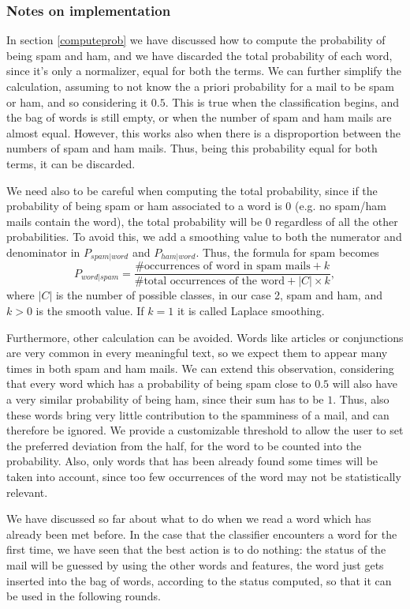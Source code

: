 \subsubsection{Notes on implementation}
In section \ref{computeprob} we have discussed how to compute the probability of being spam and ham, and we have discarded the total probability of each word, since it's only a normalizer, equal for both the terms. We can further simplify the calculation, assuming to not know the a priori probability for a mail to be spam or ham, and so considering it $0.5$. This is true when the classification begins, and the bag of words is still empty, or when the number of spam and ham mails are almost equal. However, this works also when there is a disproportion between the numbers of spam and ham mails. Thus, being this probability equal for both terms, it can be discarded.

We need also to be careful when computing the total probability, since if the probability of being spam or ham associated to a word is $0$ (e.g. no spam/ham mails contain the word), the total probability will be $0$ regardless of all the other probabilities. To avoid this, we add a smoothing value to both the numerator and denominator in $P_{spam|word}$ and $P_{ham|word}$. Thus, the formula for spam becomes $$P_{word|spam} = \frac{\mbox{\# occurrences of word in spam mails} + k}{\mbox{\# total occurrences of the word} + |C|\times k},$$ where $|C|$ is the number of possible classes, in our case 2, spam and ham, and $k > 0$ is the smooth value. If $k=1$ it is called Laplace smoothing.

Furthermore, other calculation can be avoided. Words like articles or conjunctions are very common in every meaningful text, so we expect them to appear many times in both spam and ham mails. We can extend this observation, considering that every word which has a probability of being spam close to $0.5$ will also have a very similar probability of being ham, since their sum has to be $1$. Thus, also these words bring very little contribution to the spamminess of a mail, and can therefore be ignored. We provide a customizable threshold to allow the user to set the preferred deviation from the half, for the word to be counted into the probability. Also, only words that has been already found some times will be taken into account, since too few occurrences of the word may not be statistically relevant.

We have discussed so far about what to do when we read a word which has already been met before. In the case that the classifier encounters a word for the first time, we have seen that the best action is to do nothing: the status of the mail will be guessed by using the other words and features, the word just gets inserted into the bag of words, according to the status computed, so that it can be used in the following rounds.
